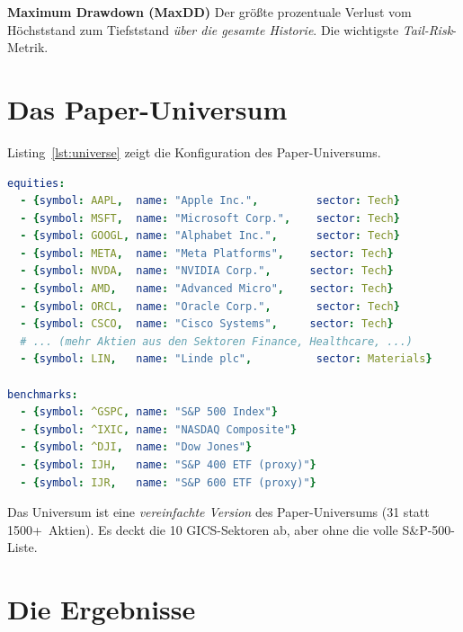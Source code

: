 \begin{definition}
\textbf{Maximum Drawdown (MaxDD)}
Der größte prozentuale Verlust vom Höchststand zum Tiefststand
\emph{über die gesamte Historie}. Die wichtigste
\emph{Tail-Risk}-Metrik.
\end{definition}

\section{Das Paper-Universum}

Listing~\ref{lst:universe} zeigt die Konfiguration des
Paper-Universums.

\begin{lstlisting}[language=yaml, caption={Paper-Universum: 31 Aktien + 5 Benchmarks},label=lst:universe]
equities:
  - {symbol: AAPL,  name: "Apple Inc.",         sector: Tech}
  - {symbol: MSFT,  name: "Microsoft Corp.",    sector: Tech}
  - {symbol: GOOGL, name: "Alphabet Inc.",      sector: Tech}
  - {symbol: META,  name: "Meta Platforms",    sector: Tech}
  - {symbol: NVDA,  name: "NVIDIA Corp.",      sector: Tech}
  - {symbol: AMD,   name: "Advanced Micro",    sector: Tech}
  - {symbol: ORCL,  name: "Oracle Corp.",       sector: Tech}
  - {symbol: CSCO,  name: "Cisco Systems",     sector: Tech}
  # ... (mehr Aktien aus den Sektoren Finance, Healthcare, ...)
  - {symbol: LIN,   name: "Linde plc",          sector: Materials}

benchmarks:
  - {symbol: ^GSPC, name: "S&P 500 Index"}
  - {symbol: ^IXIC, name: "NASDAQ Composite"}
  - {symbol: ^DJI,  name: "Dow Jones"}
  - {symbol: IJH,   name: "S&P 400 ETF (proxy)"}
  - {symbol: IJR,   name: "S&P 600 ETF (proxy)"}
\end{lstlisting}

Das Universum ist eine \emph{vereinfachte Version} des
Paper-Universums (31 statt 1500+~Aktien). Es deckt die 10
GICS-Sektoren ab, aber ohne die volle S\&P-500-Liste.

\section{Die Ergebnisse}

